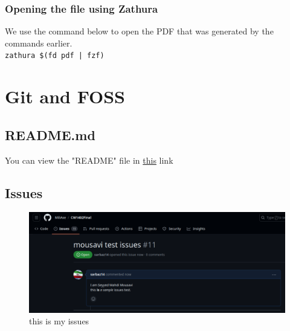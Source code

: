 \documentclass[12pt]{article}
\begin{document}
\subsubsection{Opening the file using Zathura}
We use the command below to open the PDF that was generated by the commands earlier.\\
\Large \texttt{zathura \$(fd pdf | fzf)}

\section{Git and FOSS}
\subsection{README.md}
You can view the "README" file in \href{https://github.com/sarbaz14/latex/blob/master/README.md}{this} link

\subsection{Issues}
\begin{figure}[!h]
    \centering
    \includegraphics[width=1\textwidth]{issues.png}
    \caption{this is my issues}
\end{figure}
\end{document}
